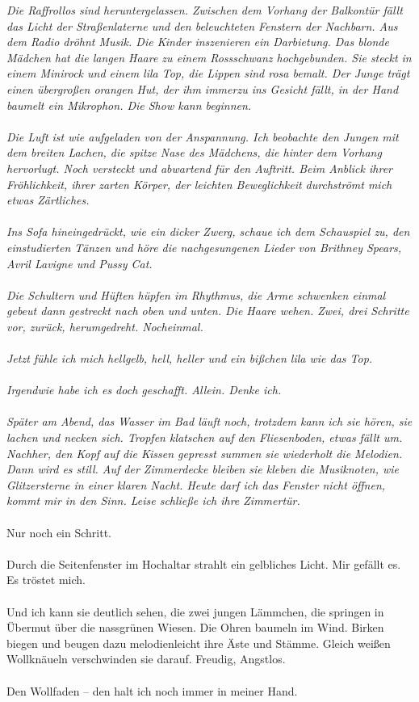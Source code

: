 \textit{Die Raffrollos sind heruntergelassen. Zwischen dem Vorhang der Balkontür fällt das Licht der Straßenlaterne und den beleuchteten Fenstern der Nachbarn.  Aus dem Radio dröhnt Musik. Die Kinder inszenieren ein Darbietung. Das blonde Mädchen hat die langen Haare zu einem Rossschwanz hochgebunden. Sie steckt in einem Minirock  und einem lila Top, die Lippen sind rosa bemalt. Der Junge trägt einen übergroßen orangen Hut, der ihm immerzu ins Gesicht fällt, in der Hand baumelt ein Mikrophon. Die Show kann beginnen. \\\\
Die Luft ist wie aufgeladen von der Anspannung. Ich beobachte den Jungen mit dem breiten Lachen, die spitze Nase des Mädchens, die hinter dem Vorhang hervorlugt. Noch versteckt und abwartend für den Auftritt. Beim Anblick ihrer Fröhlichkeit, ihrer zarten Körper, der leichten Beweglichkeit durchströmt mich etwas Zärtliches. \\\\
Ins Sofa hineingedrückt, wie ein dicker Zwerg, schaue ich dem Schauspiel zu, den einstudierten Tänzen und höre die nachgesungenen Lieder von Brithney Spears, Avril Lavigne und Pussy Cat. \\\\
Die Schultern und Hüften hüpfen im Rhythmus, die Arme schwenken einmal gebeut dann gestreckt nach oben und unten. Die Haare wehen. Zwei, drei Schritte vor, zurück, herumgedreht. Nocheinmal. \\\\
Jetzt fühle ich mich hellgelb, hell, heller und  ein bißchen lila wie das Top. \\\\
Irgendwie habe ich es doch geschafft. Allein. Denke ich.\\\\
Später am Abend, das Wasser im Bad läuft noch, trotzdem kann ich sie hören, sie lachen und necken sich. Tropfen klatschen auf den Fliesenboden, etwas fällt um. Nachher, den Kopf auf die Kissen gepresst summen sie wiederholt die Melodien. Dann wird es still. Auf der Zimmerdecke bleiben sie kleben die Musiknoten, wie Glitzersterne in einer klaren Nacht. Heute darf ich das Fenster nicht öffnen, kommt mir in den Sinn. Leise schließe ich ihre Zimmertür. }\\\\
Nur noch ein Schritt. \\\\
Durch die Seitenfenster im Hochaltar strahlt ein gelbliches Licht. Mir gefällt es. Es tröstet mich. \\\\
Und ich kann sie deutlich sehen, die zwei jungen Lämmchen, die springen in Übermut über die nassgrünen Wiesen. Die Ohren baumeln im Wind. Birken biegen und beugen dazu melodienleicht ihre Äste und Stämme. Gleich weißen Wollknäueln verschwinden sie darauf. Freudig, Angstlos. \\\\
Den Wollfaden – den halt ich noch immer in meiner Hand. 
